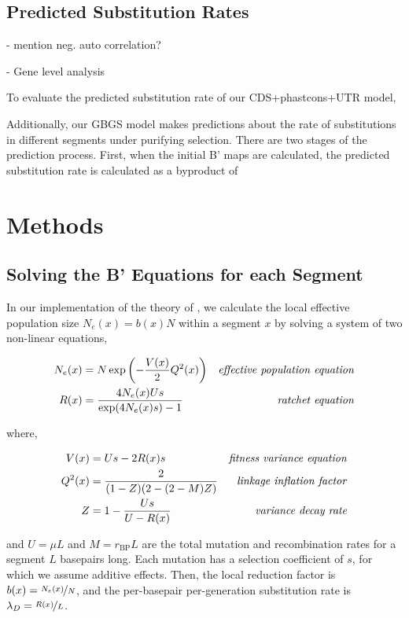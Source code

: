 \documentclass[11pt]{article}
\begin{document}
\subsection*{Predicted Substitution Rates}

- mention neg. auto correlation?

- Gene level analysis

To evaluate the predicted substitution rate of our CDS+phastcons+UTR model, 


Additionally, our GBGS model makes predictions about the rate of substitutions
in different segments under purifying selection. There are two stages of the
prediction process. First, when the initial B' maps are calculated, the
predicted substitution rate is calculated as a byproduct of 


\section*{Methods}

\subsection*{Solving the B' Equations for each Segment}

In our implementation of the theory of \textcite{Santiago2016-mu}, we calculate
the local effective population size $N_e(x) = b(x) N$ within a segment $x$ by
solving a system of two non-linear equations, 

\begin{align}
  \label{eq:}
  {N}_{e}(x) &= N \exp \left( -\frac{V(x)}{2} Q^2(x) \right) & \text{\emph{effective population equation}} \\
  {R}(x) &= \frac{4N_e(x)U s}{\exp(4 N_e(x) s)-1}  & \text{\emph{ratchet equation}} 
\end{align}

where,

\begin{align}
  V(x) &= U s - 2 {R}(x) s & \text{\emph{fitness variance equation}} \\
  Q^2(x) &= \frac{2}{(1-Z)(2-(2-M)Z)} & \text{\emph{linkage inflation factor}} \\
  Z &= 1 - \frac{Us}{U-{R(x)}} & \text{\emph{}} \text{\emph{variance decay rate}}
\end{align}

and $U = \mu L$ and $M = r_\text{BP} L$ are the total mutation and
recombination rates for a segment $L$ basepairs long. Each mutation has a
selection coefficient of $s$, for which we assume additive effects. Then, the
local reduction factor is $b(x) = \nicefrac{N_e(x)}{N}$, and the per-basepair
per-generation substitution rate is $\lambda_D = \nicefrac{R(x)}{L}$.
\end{document}
